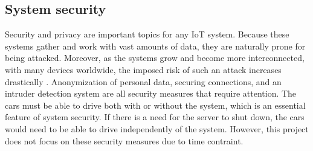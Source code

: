 \subsection{System security}
Security and privacy are important topics for any IoT system. Because these systems gather and work with vast amounts of data, they are naturally prone for being attacked. Moreover, as the systems grow and become more interconnected, with many devices worldwide, the imposed risk of such an attack increases drastically \parencite{iot_risk}. Anonymization of personal data, securing connections, and an intruder detection system are all security measures that require attention. The cars must be able to drive both with or without the system, which is an essential feature of system security. If there is a need for the server to shut down, the cars would need to be able to drive independently of the system. However, this project does not focus on these security measures due to time contraint. 